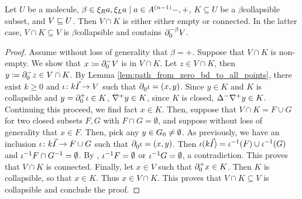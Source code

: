 \begin{lem} \label{lem:collapsible_connected_with_all_closure_element}
    Let \( U \) be a molecule, \( \beta \in \set{-, +} \), \( K \subseteq U \) be a \( \beta \)\nbd collapsible subset, and \( V \submol U \).
    Then \( V \cap K \) is either either empty or connected.
    In the latter case, \( V \cap K \subseteq V \) is \( \beta \)\nbd collapsible and contains \( \bd{0}{-\beta} V \).
\end{lem}
\begin{proof}
    Assume without loss of generality that \( \beta = + \).
    Suppose that \( V \cap K \) is non-empty.
    We show that \( x \eqdef \bd{0}{-} V \) is in \( V \cap K \).
    Let \( z \in V \cap K \), then \( y \eqdef \bd{0}{-} z \in V \cap K \).
    By Lemma \ref{lem:path_from_zero_bd_to_all_points}, there exist \( k \geq 0 \) and \( \iota \colon k\arr \to V \) such that \( \bd{0}{} \iota = (x, y) \).
    Since \( y \in K \) and \( K \) is collapsible and \( y = \bd{0}{+} \iota \in K \), \( \cofaces{}{+} y \in K \), since \( K \) is closed, \( \faces{}{-} \cofaces{}{+} y \in K \).
    Continuing this proceed, we find fact \( x \in K \).
    Then, suppose that \( V \cap K = F \cup G \) for two closed subsets \( F, G \) with \( F \cap G = \emptyset \), and suppose without loss of generality that \( x \in F \).
    Then, pick any \( y \in \gr{0}{G} \neq \emptyset \). 
    As previously, we have an inclusion \( \iota \colon k\arr \to F \cup G \) such that \( \bd{0}{}\iota = (x, y) \).
    Then \( \iota(k\arr) = \invrs{\iota}(F) \cup \invrs{\iota}(G) \) and \( \invrs{\iota}F \cap \invrs{G} = \emptyset \).
    By \cite[Lemma 3.3.13]{hadzihasanovic2024combinatorics}, \( \invrs{\iota}F = \emptyset \) or \( \invrs{\iota}G = \emptyset \), a contradiction.
    This proves that \( V \cap K \) is connected.
    Finally, let \( x \in V \) such that \( \bd{0}{+} x \in K \).
    Then \( K \) is collapsible, so that \( x \in K \).
    Thus \( x \in V \cap K \).
    This proves that \( V \cap K \subseteq V \) is collapsible and conclude the proof.
\end{proof}


